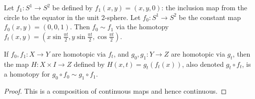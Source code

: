 \begin{example}
	Let \( f_1 \colon S^1 \to S^2 \) be defined by \( f_1(x,y) = (x,y,0) \): the inclusion map from the circle to the equator in the unit 2-sphere.
	Let \( f_0 \colon S^1 \to S^2 \) be the constant map \( f_0(x,y) = (0,0,1) \).
	Then \( f_0 \sim f_1 \) via the homotopy \( f_t(x,y) = (x\sin \frac{\pi t}{2}, y \sin \frac{\pi t}{2}, \cos \frac{\pi t}{2}) \).
\end{example}
\begin{lemma}
	If \( f_0, f_1 \colon X \to Y \) are homotopic via \( f_t \), and \( g_0, g_1 \colon Y \to Z \) are homotopic via \( g_t \), then the map \( H \colon X \times I \to Z \) defined by \( H(x,t) = g_t(f_t(x)) \), also denoted \( g_t \circ f_t \), is a homotopy for \( g_0 \circ f_0 \sim g_1 \circ f_1 \).
\end{lemma}
\begin{proof}
	This is a composition of continuous maps and hence continuous.
\end{proof}

